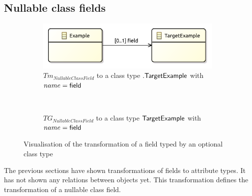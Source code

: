 \subsection{Nullable class fields}
\label{subsec:library_of_transformations:type_level_transformations:nullable_class_fields}

\begin{figure}
    \centering
    \begin{subfigure}{0.95\textwidth}
        \centering
        \includegraphics{images/05_library_of_transformations/02_type_level_transformations/08_nullable_class_fields/nullable_class_field.pdf}
        \caption{$Tm_{NullableClassField}$ to a class type $.\mathsf{TargetExample}$ with $name = \mathsf{field}$}
        \label{fig:library_of_transformations:type_level_transformations:nullable_class_fields:visualisation:ecore}
    \end{subfigure}
    \\
    \begin{subfigure}{0.95\textwidth}
        \centering
        
        \caption{$TG_{NullableClassField}$ to a class type $\mathsf{TargetExample}$ with $name = \mathsf{field}$}
        \label{fig:library_of_transformations:type_level_transformations:nullable_class_fields:visualisation:groove}
    \end{subfigure}
    \caption{Visualisation of the transformation of a field typed by an optional class type}
    \label{fig:library_of_transformations:type_level_transformations:nullable_class_fields:visualisation}
\end{figure}

The previous sections have shown transformations of fields to attribute types. It has not shown any relations between objects yet. This transformation defines the transformation of a nullable class field.

